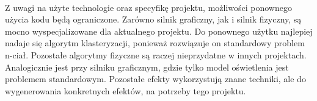 \paragraph{}

Z uwagi na użyte technologie oraz specyfikę projektu, możliwości ponownego użycia kodu będą ograniczone. Zarówno silnik graficzny, jak i silnik fizyczny, są mocno wyspecjalizowane dla aktualnego projektu. Do ponownego użytku najlepiej nadaje się algorytm klasteryzacji, ponieważ rozwiązuje on standardowy problem n-ciał. Pozostałe algorytmy fizyczne są raczej nieprzydatne w innych projektach. Analogicznie jest przy silniku graficznym, gdzie tylko model oświetlenia jest problemem standardowym. Pozostałe efekty wykorzystują znane techniki, ale do wygenerowania konkretnych efektów, na potrzeby tego projektu.

